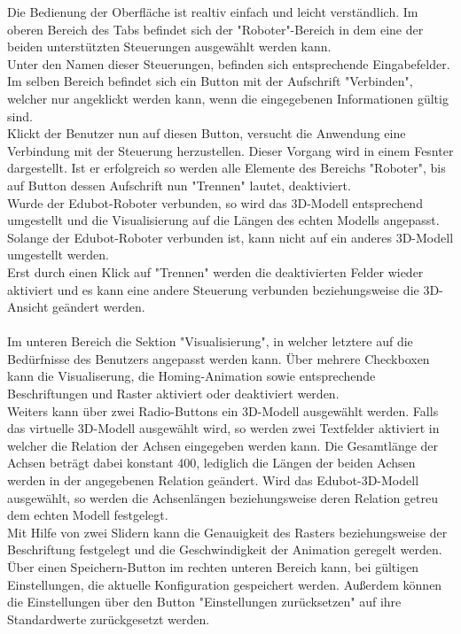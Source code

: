 Die Bedienung der Oberfläche ist realtiv einfach und leicht verständlich. Im oberen Bereich des Tabs befindet sich der "Roboter"-Bereich in dem eine der beiden unterstützten Steuerungen ausgewählt werden kann.\\ 
Unter den Namen dieser Steuerungen, befinden sich entsprechende Eingabefelder. Im selben Bereich befindet sich ein Button mit der Aufschrift "Verbinden", welcher nur angeklickt werden kann, wenn die eingegebenen Informationen gültig sind.\\
Klickt der Benutzer nun auf diesen Button, versucht die Anwendung eine Verbindung mit der Steuerung herzustellen. Dieser Vorgang wird in einem Fesnter dargestellt. Ist er erfolgreich so werden alle Elemente des Bereichs "Roboter", bis auf Button dessen Aufschrift nun "Trennen" lautet, deaktiviert. \\
Wurde der Edubot-Roboter verbunden, so wird das 3D-Modell entsprechend umgestellt und die Visualisierung auf die Längen des echten Modells angepasst. Solange der Edubot-Roboter verbunden ist, kann nicht auf ein anderes 3D-Modell umgestellt werden.\\
Erst durch einen Klick auf "Trennen" werden die deaktivierten Felder wieder aktiviert und es kann eine andere Steuerung verbunden beziehungsweise die 3D-Ansicht geändert werden.\\
\\
Im unteren Bereich die Sektion "Visualisierung", in welcher letztere auf die Bedürfnisse des Benutzers angepasst werden kann. Über mehrere Checkboxen kann die Visualiserung, die Homing-Animation sowie entsprechende Beschriftungen und Raster aktiviert oder deaktiviert werden. \\
Weiters kann über zwei Radio-Buttons ein 3D-Modell ausgewählt werden. Falls das virtuelle 3D-Modell ausgewählt wird, so werden zwei Textfelder aktiviert in welcher die Relation der Achsen eingegeben werden kann. Die Gesamtlänge der Achsen beträgt dabei konstant 400, lediglich die Längen der beiden Achsen werden in der angegebenen Relation geändert. Wird das Edubot-3D-Modell ausgewählt, so werden die Achsenlängen beziehungsweise deren Relation getreu dem echten Modell festgelegt.\\
Mit Hilfe von zwei Slidern kann die Genauigkeit des Rasters beziehungsweise der Beschriftung festgelegt und die Geschwindigkeit der Animation geregelt werden.\\
Über einen Speichern-Button im rechten unteren Bereich kann, bei gültigen Einstellungen, die aktuelle Konfiguration gespeichert werden. Außerdem können die Einstellungen über den Button "Einstellungen zurücksetzen" auf ihre Standardwerte zurückgesetzt werden.

